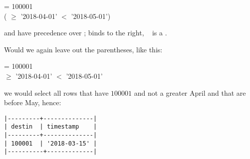   = 100001 \\
\hspace*{0.45cm}  
( $\ge$ '2018-04-01'
  $<$ '2018-05-01')

 and  have precedence
over ;  binds to the right,
\ie\  is a .

Would we again leave out the parentheses,
like this:

  = 100001 \\
\hspace*{0.45cm}  
 $\ge$ '2018-04-01'
  $<$ '2018-05-01'

we would select all rows that have 
$100001$ and not a  greater April
and that are before May, hence:

\begin{minipage}{\textwidth}
\begin{verbatim}
|---------+--------------|
| destin  | timestamp    |
|---------+--------------|
| 100001  | '2018-03-15' |
|----------+-------------|
\end{verbatim}
\end{minipage}

